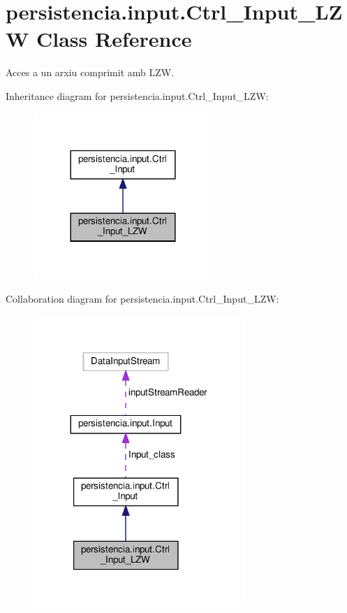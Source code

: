 \hypertarget{classpersistencia_1_1input_1_1Ctrl__Input__LZW}{}\section{persistencia.\+input.\+Ctrl\+\_\+\+Input\+\_\+\+L\+ZW Class Reference}
\label{classpersistencia_1_1input_1_1Ctrl__Input__LZW}


Acces a un arxiu comprimit amb L\+ZW.  




Inheritance diagram for persistencia.\+input.\+Ctrl\+\_\+\+Input\+\_\+\+L\+ZW\+:\nopagebreak
\begin{figure}[H]
\begin{center}
\leavevmode
\includegraphics[width=192pt]{classpersistencia_1_1input_1_1Ctrl__Input__LZW__inherit__graph}
\end{center}
\end{figure}


Collaboration diagram for persistencia.\+input.\+Ctrl\+\_\+\+Input\+\_\+\+L\+ZW\+:\nopagebreak
\begin{figure}[H]
\begin{center}
\leavevmode
\includegraphics[width=227pt]{classpersistencia_1_1input_1_1Ctrl__Input__LZW__coll__graph}
\end{center}
\end{figure}
